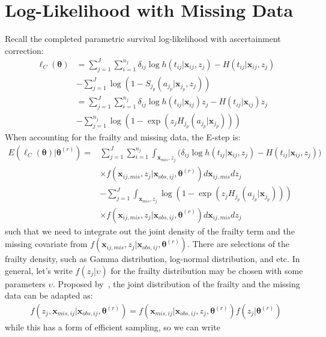 \documentclass[preprint,12pt]{elsarticle}
\begin{document}
\section{Log-Likelihood with Missing Data}
Recall the completed parametric survival log-likelihood with ascertainment correction:
\begin{align} 
    \ell_C(\boldsymbol{\theta})&=\sum_{j=1}^J\sum_{i=1}^{n_j}\delta_{ij}\log h(t_{ij}|\mathbf{x}_{ij}, z_j) - H(t_{ij}|\mathbf{x}_{ij}, z_j)\\
    &-\sum_{j=1}^J \log (1-S_{j_p}(a_{j_p}|\mathbf{x}_{j_p}, z_j)) \\
    &= \sum_{j=1}^J\sum_{i=1}^{n_j}\delta_{ij}\log h(t_{ij}|\mathbf{x}_{ij})z_j - H(t_{ij}|\mathbf{x}_{ij})z_j \\
    &- \sum_{j=1}^{n_j} \log(1- \exp(z_j H_{j_p}(a_{j_p}|\mathbf{x}_{j_p})))
\end{align}
When accounting for the frailty and missing data, the E-step is:
\begin{align} 
    E(\ell_C(\boldsymbol{\theta})|\boldsymbol{\theta}^{(r)})=&\sum_{j=1}^J\sum_{i=1}^{n_j}\int_{\mathbf{x}_{mis}, z_j}\Big (\delta_{ij}\log h(t_{ij}|\mathbf{x}_{ij}, z_j) - H(t_{ij}|\mathbf{x}_{ij}, z_j)\Big )\\
    &\times f(\mathbf{x}_{ij,mis}, z_j|\mathbf{x}_{obs,ij}, \boldsymbol{\theta}^{(r)})d\mathbf{x}_{ij,mis}dz_j\\
    &-\sum_{j=1}^J \int_{\mathbf{x}_{mis}, z_j} \log(1- \exp(z_j H_{j_p}(a_{j_p}|\mathbf{x}_{j_p})))\\
    &\times f(\mathbf{x}_{ij,mis}, z_j|\mathbf{x}_{obs,ij}, \boldsymbol{\theta}^{(r)})d\mathbf{x}_{ij,mis}dz_j
\end{align}
such that we need to integrate out the joint density of the frailty term and the missing covariate from $f(\mathbf{x}_{ij,mis}, z_j|\mathbf{x}_{obs,ij}, \boldsymbol{\theta}^{(r)})$. 
There are selections of the frailty density, such as Gamma distribution, log-normal distribution, and etc. 
In general, let's write $f(z_j|\upsilon)$ for the frailty distribution may be chosen with some parameters $\upsilon$. 
Proposed by~\citet{herring2002frailty}, the joint distribution of the frailty and the missing data can be adapted as:
\begin{align} 
    f(z_j,\mathbf{x}_{mis,ij}|\mathbf{x}_{obs,ij}, \boldsymbol{\theta}^{(r)})=f(\mathbf{x}_{mis, ij}|\mathbf{x}_{obs,ij}, z_j, \boldsymbol{\theta}^{(r)})f(z_j|\boldsymbol{\theta}^{(r)})
\end{align}
while this has a form of efficient sampling, so we can write
\end{document}
